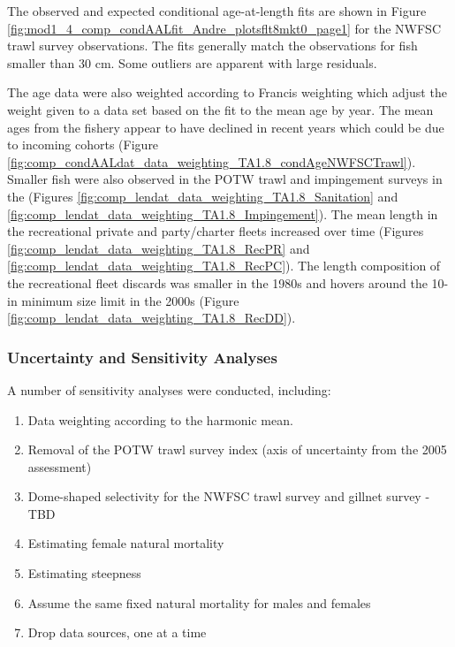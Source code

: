 \documentclass[12pt,]{article}
\begin{document}
The observed and expected conditional age-at-length fits are shown in
Figure \ref{fig:mod1_4_comp_condAALfit_Andre_plotsflt8mkt0_page1} for
the NWFSC trawl survey observations. The fits generally match the
observations for fish smaller than 30 cm. Some outliers are apparent
with large residuals.

The age data were also weighted according to Francis weighting which
adjust the weight given to a data set based on the fit to the mean age
by year. The mean ages from the fishery appear to have declined in
recent years which could be due to incoming cohorts (Figure
\ref{fig:comp_condAALdat_data_weighting_TA1.8_condAgeNWFSCTrawl}).\\
Smaller fish were also observed in the POTW trawl and impingement
surveys in the (Figures
\ref{fig:comp_lendat_data_weighting_TA1.8_Sanitation} and
\ref{fig:comp_lendat_data_weighting_TA1.8_Impingement}). The mean length
in the recreational private and party/charter fleets increased over time
(Figures \ref{fig:comp_lendat_data_weighting_TA1.8_RecPR} and
\ref{fig:comp_lendat_data_weighting_TA1.8_RecPC}). The length
composition of the recreational fleet discards was smaller in the 1980s
and hovers around the 10-in minimum size limit in the 2000s (Figure
\ref{fig:comp_lendat_data_weighting_TA1.8_RecDD}).

\subsubsection{Uncertainty and Sensitivity
Analyses}\label{uncertainty-and-sensitivity-analyses}

A number of sensitivity analyses were conducted, including:

\begin{enumerate}

  \item Data weighting according to the harmonic mean.
  
  \item Removal of the POTW trawl survey index (axis of uncertainty from the 2005 assessment)
  
  \item Dome-shaped selectivity for the NWFSC trawl survey and gillnet survey - TBD
  
  \item Estimating female natural mortality
  
  \item Estimating steepness
  
  \item Assume the same fixed natural mortality for males and females
  
  \item Drop data sources, one at a time
  
  
\end{enumerate}
\end{document}
